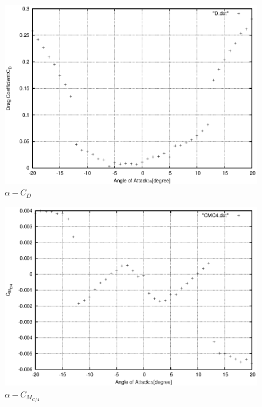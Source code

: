 \documentclass[a4j,twoside,openright,11pt]{jarticle}
\begin{document}
\begin{figure}[htbp]
\begin{center}
\includegraphics[width=12cm]{./CD/CD.eps}
\end{center}
\caption{$\alpha - C_D$}
\end{figure}

\begin{figure}[htbp]
\begin{center}
\includegraphics[width=12cm]{./CMC4/CMC4.eps}
\end{center}
\caption{$\alpha - C_{M_{C/4}}$}
\end{figure}
\end{document}

